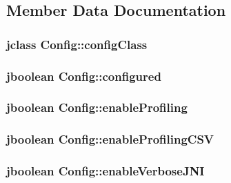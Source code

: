 \subsection{Member Data Documentation}
\hypertarget{class_config_a7e79ccce393887ace81c263dbc82b0e1}{
\subsubsection[{config\-Class}]{\setlength{\rightskip}{0pt plus 5cm}jclass Config\-::config\-Class}}\label{class_config_a7e79ccce393887ace81c263dbc82b0e1}
\hypertarget{class_config_a84a74c64a238bf8c965c475de0b17124}{
\subsubsection[{configured}]{\setlength{\rightskip}{0pt plus 5cm}jboolean Config\-::configured}}\label{class_config_a84a74c64a238bf8c965c475de0b17124}
\hypertarget{class_config_a403c9cdc52ef31d933ee055d3165a35e}{
\subsubsection[{enable\-Profiling}]{\setlength{\rightskip}{0pt plus 5cm}jboolean Config\-::enable\-Profiling}}\label{class_config_a403c9cdc52ef31d933ee055d3165a35e}
\hypertarget{class_config_afb0e37ad017cbf220fcac529fa644944}{
\subsubsection[{enable\-Profiling\-C\-S\-V}]{\setlength{\rightskip}{0pt plus 5cm}jboolean Config\-::enable\-Profiling\-C\-S\-V}}\label{class_config_afb0e37ad017cbf220fcac529fa644944}
\hypertarget{class_config_af48b23080ff93b7f7720f228715c4eb2}{
\subsubsection[{enable\-Verbose\-J\-N\-I}]{\setlength{\rightskip}{0pt plus 5cm}jboolean Config\-::enable\-Verbose\-J\-N\-I}}\label{class_config_af48b23080ff93b7f7720f228715c4eb2}
